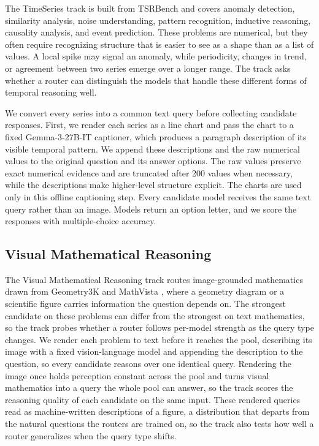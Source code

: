The TimeSeries track is built from TSRBench and covers anomaly detection, similarity analysis, noise understanding, pattern recognition, inductive reasoning, causality analysis, and event prediction. These problems are numerical, but they often require recognizing structure that is easier to see as a shape than as a list of values. A local spike may signal an anomaly, while periodicity, changes in trend, or agreement between two series emerge over a longer range. The track asks whether a router can distinguish the models that handle these different forms of temporal reasoning well.

We convert every series into a common text query before collecting candidate responses. First, we render each series as a line chart and pass the chart to a fixed Gemma-3-27B-IT \citep{team2025gemma} captioner, which produces a paragraph description of its visible temporal pattern. We append these descriptions and the raw numerical values to the original question and its answer options. The raw values preserve exact numerical evidence and are truncated after 200 values when necessary, while the descriptions make higher-level structure explicit. The charts are used only in this offline captioning step. Every candidate model receives the same text query rather than an image. Models return an option letter, and we score the responses with multiple-choice accuracy.







\subsection{Visual Mathematical Reasoning}  \label{app:math_image}

The Visual Mathematical Reasoning track routes image-grounded mathematics drawn from Geometry3K \citep{lu2021inter} and MathVista \citep{lu2024mathvista}, where a geometry diagram or a scientific figure carries information the question depends on. The strongest candidate on these problems can differ from the strongest on text mathematics, so the track probes whether a router follows per-model strength as the query type changes. We render each problem to text before it reaches the pool, describing its image with a fixed vision-language model and appending the description to the question, so every candidate reasons over one identical query. Rendering the image once holds perception constant across the pool and turns visual mathematics into a query the whole pool can answer, so the track scores the reasoning quality of each candidate on the same input. These rendered queries read as machine-written descriptions of a figure, a distribution that departs from the natural questions the routers are trained on, so the track also tests how well a router generalizes when the query type shifts.

